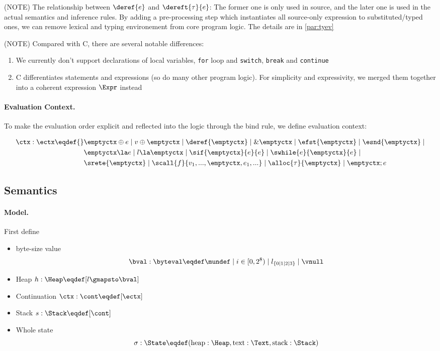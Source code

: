 (NOTE) The relationship between $\deref{e}$ and $\dereft{\tau}{e}$: The former one is only used in source,
and the later one is used in the actual semantics and inference rules.
By adding a pre-processing step which instantiates all source-only expression to substituted/typed ones,
we can remove lexical and typing environement from core program logic. The details are in \ref{par:tyev}

(NOTE) Compared with C, there are several notable differences:
\begin{enumerate}
  \item We currently don't support declarations of local variables, \texttt{for} loop and \texttt{switch},
    \texttt{break} and \texttt{continue}
  \item C differentiates statements and expressions (so do many other program logic). For simplicity and
    expressivity, we merged them together into a coherent expression $\Expr$ instead
\end{enumerate}

\paragraph{Evaluation Context.}

To make the evaluation order explicit and reflected into the logic through the bind rule,
we define evaluation context:

\begin{align*}
    \ctx : \ectx \eqdef{}&
        \emptyctx \oplus e \mid v \oplus \emptyctx \mid
        \deref{\emptyctx} \mid \& \emptyctx \mid
        \efst{\emptyctx} \mid \esnd{\emptyctx} \mid \\&
        \emptyctx \la e \mid l \la \emptyctx \mid \sif{\emptyctx}{e}{e} \mid \swhile{e}{\emptyctx}{e} \mid \\&
        \srete{\emptyctx} \mid \scall{f}{v_1, ..., \emptyctx, e_1, ...} \mid \alloc{\tau}{\emptyctx} \mid \emptyctx ; e
\end{align*}

\subsection{Semantics}\label{sec:semantics}
\paragraph{Model.}

First define
\begin{itemize}
\item byte-size value \[\bval : \byteval \eqdef \mundef \mid i \in [0, 2^8) \mid l_{\{0 \mid 1 \mid 2 \mid 3\}} \mid \vnull\]
\item Heap $h: \Heap \eqdef [ l \gmapsto \bval ]$
\item Continuation $\ctx: \cont \eqdef [\ectx]$
\item Stack $s: \Stack \eqdef [\cont]$
\item Whole state \[\sigma: \State \eqdef (\text{heap}: \Heap, \text{text}: \Text, \text{stack}: \Stack)\]
\end{itemize}

